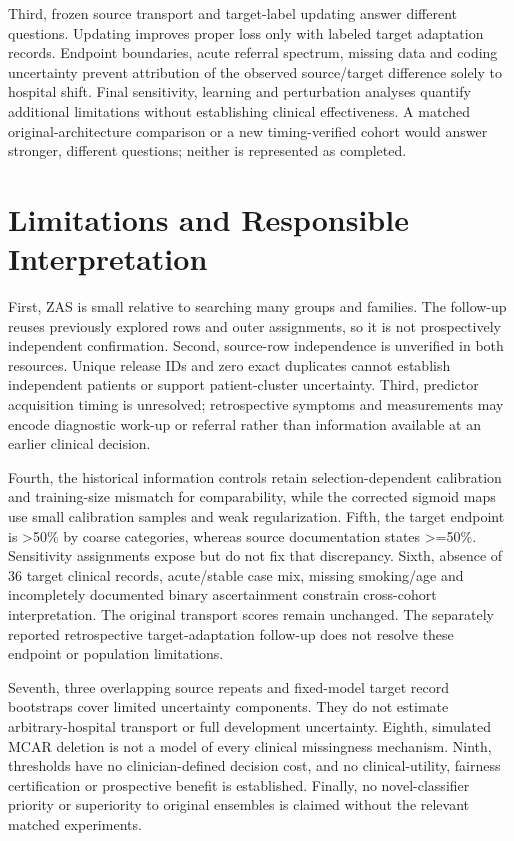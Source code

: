 \documentclass[conference,10pt]{IEEEtran}
\begin{document}
Third, frozen source transport and target-label updating answer different questions. Updating improves proper loss only with labeled target adaptation records. Endpoint boundaries, acute referral spectrum, missing data and coding uncertainty prevent attribution of the observed source/target difference solely to hospital shift. Final sensitivity, learning and perturbation analyses quantify additional limitations without establishing clinical effectiveness. A matched original-architecture comparison or a new timing-verified cohort would answer stronger, different questions; neither is represented as completed.

\section{Limitations and Responsible Interpretation}
First, ZAS is small relative to searching many groups and families. The follow-up reuses previously explored rows and outer assignments, so it is not prospectively independent confirmation. Second, source-row independence is unverified in both resources. Unique release IDs and zero exact duplicates cannot establish independent patients or support patient-cluster uncertainty. Third, predictor acquisition timing is unresolved; retrospective symptoms and measurements may encode diagnostic work-up or referral rather than information available at an earlier clinical decision.

Fourth, the historical information controls retain selection-dependent calibration and training-size mismatch for comparability, while the corrected sigmoid maps use small calibration samples and weak regularization. Fifth, the target endpoint is >50\% by coarse categories, whereas source documentation states >=50\%. Sensitivity assignments expose but do not fix that discrepancy. Sixth, absence of 36 target clinical records, acute/stable case mix, missing smoking/age and incompletely documented binary ascertainment constrain cross-cohort interpretation. The original transport scores remain unchanged. The separately reported retrospective target-adaptation follow-up does not resolve these endpoint or population limitations.

Seventh, three overlapping source repeats and fixed-model target record bootstraps cover limited uncertainty components. They do not estimate arbitrary-hospital transport or full development uncertainty. Eighth, simulated MCAR deletion is not a model of every clinical missingness mechanism. Ninth, thresholds have no clinician-defined decision cost, and no clinical-utility, fairness certification or prospective benefit is established. Finally, no novel-classifier priority or superiority to original ensembles is claimed without the relevant matched experiments.
\end{document}
